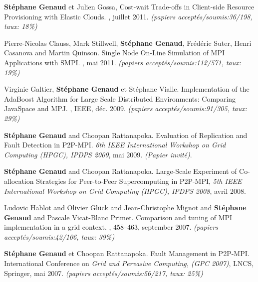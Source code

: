 \documentclass[11pt]{article}
\newcommand{\pmpi}{\mbox{\textsc{P2P-MPI}}}
\begin{document}
\begin{thebibliography}{99}
\newblock \textbf{Stéphane Genaud} et Julien Gossa,
\newblock Cost-wait Trade-offs in Client-side Resource Provisioning with 
Elastic Clouds.
, juillet 2011.
\newblock \small{\textit{(papiers acceptés/soumis{:}36/198, taux: 18\%)}}


\newblock Pierre-Nicolas Clauss, Mark Stillwell, \textbf{Stéphane Genaud}, 
Fr\'ed\'eric Suter, Henri Casanova and  Martin Quinson.
\newblock Single Node On-Line Simulation of MPI Applications with SMPI.
, mai 2011.
\newblock \small{\textit{(papiers acceptés/soumis{:}112/571, taux: 19\%)}}

\newblock Virginie Galtier, \textbf{Stéphane Genaud} et Stéphane Vialle.
\newblock Implementation of the AdaBoost Algorithm for Large Scale Distributed 
Environments: Comparing JavaSpace and MPJ.
, 
IEEE, déc. 2009.
\newblock \small{\textit{(papiers acceptés/soumis:91/305, taux: 29\%)}}


\textbf{Stéphane Genaud} and Choopan Rattanapoka.
\newblock Evaluation of Replication and Fault Detection in P2P-MPI.
\newblock 
{\em 6th IEEE International Workshop on Grid Computing (HPGC), IPDPS 2009}, 
mai 2009.
\newblock \textit{(Papier invité)}.

\textbf{Stéphane Genaud} and Choopan Rattanapoka. 
\newblock Large-Scale Experiment of Co-allocation Strategies for Peer-to-Peer 
Supercomputing in P2P-MPI,
\newblock 
{\em 5th IEEE International Workshop on Grid Computing (HPGC), IPDPS 2008}, 
avril 2008.

Ludovic Hablot and Olivier Glück and Jean-Christophe Mignot and \textbf{Stéphane Genaud} and Pascale Vicat-Blanc Primet.
\newblock Comparison and tuning of MPI implementation in a grid context.
, 458--463, september 2007.
\newblock \small{\textit{(papiers acceptés/soumis:42/106, taux: 39\%)}}

\newblock \textbf{Stéphane Genaud} et Choopan Rattanapoka.
\newblock Fault Management in {\pmpi}. 
\newblock International Conference on {\em Grid and Pervasive Computing, 
(GPC 2007)}, LNCS, Springer, mai 2007.
\newblock \small{\textit{(papiers acceptés/soumis:56/217, taux: 25\%)}}


\end{thebibliography}
\end{document}
